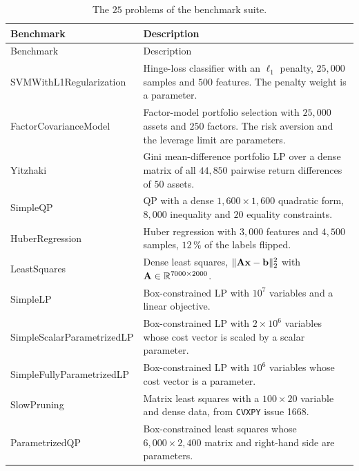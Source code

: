 {\small
\begin{longtable}{l >{\raggedright\arraybackslash}p{9.6cm}}
\caption[Benchmark problems]{The $25$ problems of the benchmark suite.}\label{tab:instances-desc}\\
\toprule
Benchmark & Description \\
\midrule
\endfirsthead
\toprule
Benchmark & Description \\
\midrule
\endhead
\bottomrule
\endfoot
SVMWithL1Regularization & Hinge-loss classifier with an $\ell_1$ penalty, $25{,}000$ samples and $500$ features. The penalty weight is a parameter. \\
FactorCovarianceModel & Factor-model portfolio selection with $25{,}000$ assets and $250$ factors. The risk aversion and the leverage limit are parameters. \\
Yitzhaki & Gini mean-difference portfolio \ac{LP} over a dense matrix of all $44{,}850$ pairwise return differences of $50$ assets. \\
SimpleQP & \ac{QP} with a dense $1{,}600 \times 1{,}600$ quadratic form, $8{,}000$ inequality and $20$ equality constraints. \\
HuberRegression & Huber regression with $3{,}000$ features and $4{,}500$ samples, $12\,\%$ of the labels flipped. \\
LeastSquares & Dense least squares, $\lVert \mathbf{A}\mathbf{x} - \mathbf{b} \rVert_2^2$ with $\mathbf{A} \in \mathbb{R}^{7000 \times 2000}$. \\
SimpleLP & Box-constrained \ac{LP} with $10^7$ variables and a linear objective. \\
SimpleScalarParametrizedLP & Box-constrained \ac{LP} with $2 \times 10^6$ variables whose cost vector is scaled by a scalar parameter. \\
SimpleFullyParametrizedLP & Box-constrained \ac{LP} with $10^6$ variables whose cost vector is a parameter. \\
SlowPruning & Matrix least squares with a $100 \times 20$ variable and dense data, from \texttt{CVXPY} issue 1668. \\
ParametrizedQP & Box-constrained least squares whose $6{,}000 \times 2{,}400$ matrix and right-hand side are parameters. \\

\end{longtable}}
